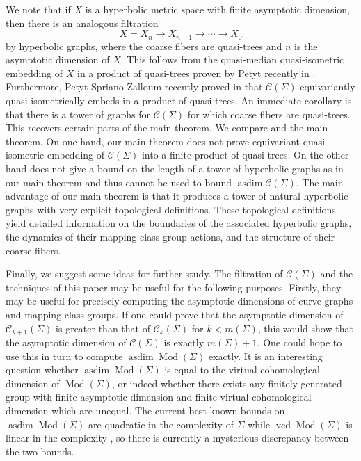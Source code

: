 \documentclass[11pt]{article}
\theoremstyle{remark}
\def\C{{\mathcal C}}
\def\Mod{\operatorname{Mod}}
\def\asdim{\operatorname{asdim}}
\begin{document}
We note that if $X$ is a hyperbolic metric space with finite asymptotic dimension, then
there is an analogous filtration
\[
  X=X_n \to X_{n-1} \to \cdots \to X_0
\]
by hyperbolic graphs, where the coarse fibers are quasi-trees and $n$ is the
asymptotic dimension of $X$. This follows from the quasi-median quasi-isometric
embedding of $X$ in a product of quasi-trees
proven by Petyt recently in \cite{Petyt}. Furthermore, Petyt-Spriano-Zalloum
recently proved in \cite[Theorem 1.3]{stablecylinders} that $\C(\Sigma)$ equivariantly
quasi-isometrically embeds in a product of quasi-trees. An immediate corollary
is that there is a tower of graphs for $\C(\Sigma)$ for which coarse fibers
are quasi-trees. This recovers certain parts of the main theorem.
We compare \cite[Theorem 1.3]{stablecylinders} and the main theorem.
On one hand, our main theorem does not prove equivariant quasi-isometric
embedding of $\C(\Sigma)$ into a finite product of quasi-trees.
On the other hand \cite[Theorem 1.3]{stablecylinders} does not give a
bound on the length of a tower of hyperbolic graphs as in our main theorem
and thus cannot be used to bound $\asdim \C(\Sigma)$.
The main advantage of our main theorem is that it produces a tower of
natural hyperbolic graphs with very explicit topological definitions.
These topological definitions yield detailed information on the boundaries
of the associated hyperbolic graphs, the dynamics of their mapping class group
actions, and the structure of their coarse fibers.

Finally, we suggest some ideas for further study. The filtration of $\C(\Sigma)$
and the techniques of this paper may be useful for the following purposes. Firstly,
they may be useful for precisely computing the asymptotic dimensions of curve graphs
and mapping class groups. If one could prove that the asymptotic dimension
of $\C_{k+1}(\Sigma)$ is greater than that of $\C_k(\Sigma)$ for $k<m(\Sigma)$,
this would show that
the asymptotic dimension of $\C(\Sigma)$ is exactly $m(\Sigma)+1$.
One could hope to use this in turn to compute $\asdim \Mod(\Sigma)$ exactly.
It is an interesting question whether $\asdim \Mod(\Sigma)$ is equal to the
virtual cohomological dimension of $\Mod(\Sigma)$, or indeed whether there exists any
finitely generated group with finite asymptotic dimension and finite virtual cohomological
dimension which are unequal. The current best known bounds on $\asdim \Mod(\Sigma)$
are quadratic in the complexity of $\Sigma$ \cite{BBF, BHS} while
$\operatorname{vcd} \Mod(\Sigma)$ is linear in the complexity \cite{vcd},
so there is currently a mysterious discrepancy between the two bounds.
\end{document}
